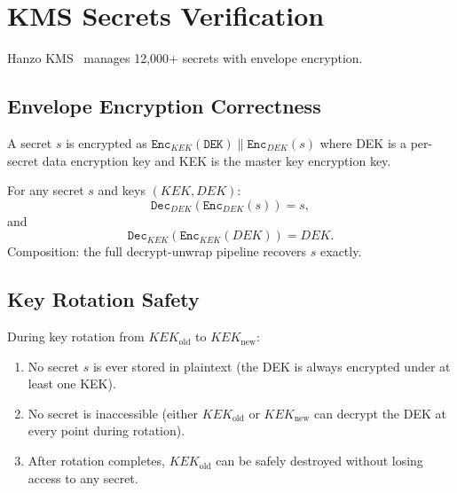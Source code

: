 \section{KMS Secrets Verification}

\label{sec:kms}

Hanzo KMS~\cite{hanzokms} manages 12,000+ secrets with envelope encryption.

\subsection{Envelope Encryption Correctness}

\begin{definition}
A secret $s$ is encrypted as $\texttt{Enc}_{KEK}(\texttt{DEK}) \|
\texttt{Enc}_{DEK}(s)$ where DEK is a per-secret data encryption key and
KEK is the master key encryption key.
\end{definition}

\begin{theorem}
For any secret $s$ and keys $(KEK, DEK)$:
\begin{equation}
\texttt{Dec}_{DEK}(\texttt{Enc}_{DEK}(s)) = s,
\end{equation}
and
\begin{equation}
\texttt{Dec}_{KEK}(\texttt{Enc}_{KEK}(DEK)) = DEK.
\end{equation}
Composition: the full decrypt-unwrap pipeline recovers $s$ exactly.
\end{theorem}

\subsection{Key Rotation Safety}

\begin{theorem}
During key rotation from $KEK_{\text{old}}$ to $KEK_{\text{new}}$:
\begin{enumerate}[leftmargin=1.4em]
    \item No secret $s$ is ever stored in plaintext (the DEK is always
    encrypted under at least one KEK).
    \item No secret is inaccessible (either $KEK_{\text{old}}$ or
    $KEK_{\text{new}}$ can decrypt the DEK at every point during rotation).
    \item After rotation completes, $KEK_{\text{old}}$ can be safely destroyed
    without losing access to any secret.
\end{enumerate}
\end{theorem}

